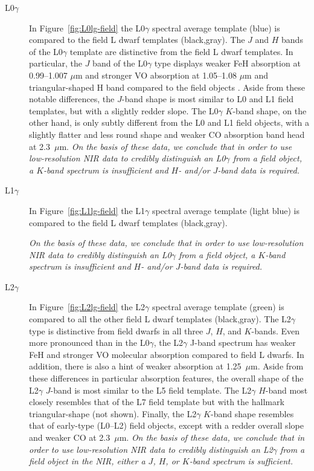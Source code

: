 \documentclass[12pt,preprint]{aastex}
\begin{document}
\begin{description}
\item[L0$\gamma$]{
In Figure~\ref{fig:L0lg-field} the L0$\gamma$ spectral average template (blue) is compared to the field L dwarf templates (black,gray).  
The $J$ and $H$ bands of the L0$\gamma$ template are distinctive from the field L dwarf templates. 
In particular, the $J$ band of the L0$\gamma$ type displays weaker FeH absorption at 0.99--1.007 $\mu$m and stronger VO absorption at 1.05--1.08 $\mu$m and triangular-shaped H band compared to the field objects \citep{Kirkpatrick06}. 
Aside from these notable differences, the $J$-band shape is most similar to L0 and L1 field templates, but with a slightly redder slope. 
The L0$\gamma$ $K$-band shape, on the other hand, is only subtly different from the L0 and L1 field objects, with a slightly flatter and less round shape and weaker CO absorption band head at 2.3~$\mu$m. 
\emph{On the basis of these data, we conclude that in order to use low-resolution NIR data to credibly distinguish an L0$\gamma$ from a field object, a $K$-band spectrum is insufficient and $H$- and/or $J$-band data is required.}
}

\item[L1$\gamma$]{
In Figure~\ref{fig:L1lg-field} the L1$\gamma$ spectral average template (light blue) is compared to the field L dwarf templates (black,gray).

\emph{On the basis of these data, we conclude that in order to use low-resolution NIR data to credibly distinguish an L0$\gamma$ from a field object, a $K$-band spectrum is insufficient and $H$- and/or $J$-band data is required.}

}

\item[L2$\gamma$]{
In Figure~\ref{fig:L2lg-field} the L2$\gamma$ spectral average template (green) is compared to all the other field L dwarf templates (black,gray). 
The L2$\gamma$ type is distinctive from field dwarfs in all three $J$, $H$, and $K$-bands. 
Even more pronounced than in the L0$\gamma$, the L2$\gamma$ J-band spectrum has weaker FeH and stronger VO molecular absorption compared to field L dwarfs. 
In addition, there is also a hint of weaker  absorption at 1.25~$\mu$m. Aside from these differences in particular absorption features, the overall shape of the L2$\gamma$ $J$-band is most similar to the L5 field template.
The L2$\gamma$ $H$-band most closely resembles that of the L7 field template but with the hallmark  triangular-shape (not shown). 
Finally, the L2$\gamma$ $K$-band shape resembles that of early-type (L0--L2) field objects, except with a redder overall slope and weaker CO at 2.3~$\mu$m. 
\emph{On the basis of these data, we conclude that in order to use low-resolution NIR data to credibly distinguish an L2$\gamma$ from a field object in the NIR, either a $J$, $H$, or $K$-band spectrum is sufficient.}
}


\end{description}
\end{document}
